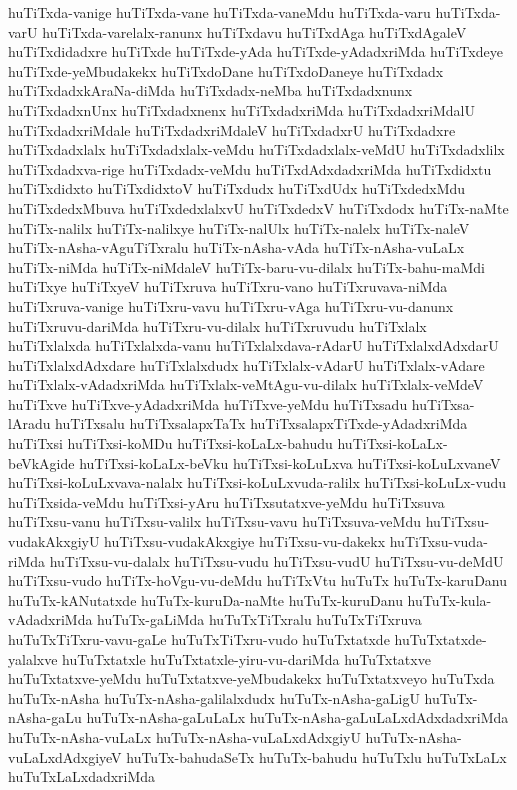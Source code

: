 {huTiTxda-vanige
huTiTxda-vane
huTiTxda-vaneMdu
huTiTxda-varu
huTiTxda-varU
huTiTxda-varelalx-ranunx
huTiTxdavu
huTiTxdAga
huTiTxdAgaleV
huTiTxdidadxre
huTiTxde
huTiTxde-yAda
huTiTxde-yAdadxriMda
huTiTxdeye
huTiTxde-yeMbudakekx
huTiTxdoDane
huTiTxdoDaneye
huTiTxdadx
huTiTxdadxkAraNa-diMda
huTiTxdadx-neMba
huTiTxdadxnunx
huTiTxdadxnUnx
huTiTxdadxnenx
huTiTxdadxriMda
huTiTxdadxriMdalU
huTiTxdadxriMdale
huTiTxdadxriMdaleV
huTiTxdadxrU
huTiTxdadxre
huTiTxdadxlalx
huTiTxdadxlalx-veMdu
huTiTxdadxlalx-veMdU
huTiTxdadxlilx
huTiTxdadxva-rige
huTiTxdadx-veMdu
huTiTxdAdxdadxriMda
huTiTxdidxtu
huTiTxdidxto
huTiTxdidxtoV
huTiTxdudx
huTiTxdUdx
huTiTxdedxMdu
huTiTxdedxMbuva
huTiTxdedxlalxvU
huTiTxdedxV
huTiTxdodx
huTiTx-naMte
huTiTx-nalilx
huTiTx-nalilxye
huTiTx-nalUlx
huTiTx-nalelx
huTiTx-naleV
huTiTx-nAsha-vAguTiTxralu
huTiTx-nAsha-vAda
huTiTx-nAsha-vuLaLx
huTiTx-niMda
huTiTx-niMdaleV
huTiTx-baru-vu-dilalx
huTiTx-bahu-maMdi
huTiTxye
huTiTxyeV
huTiTxruva
huTiTxru-vano
huTiTxruvava-niMda
huTiTxruva-vanige
huTiTxru-vavu
huTiTxru-vAga
huTiTxru-vu-danunx
huTiTxruvu-dariMda
huTiTxru-vu-dilalx
huTiTxruvudu
huTiTxlalx
huTiTxlalxda
huTiTxlalxda-vanu
huTiTxlalxdava-rAdarU
huTiTxlalxdAdxdarU
huTiTxlalxdAdxdare
huTiTxlalxdudx
huTiTxlalx-vAdarU
huTiTxlalx-vAdare
huTiTxlalx-vAdadxriMda
huTiTxlalx-veMtAgu-vu-dilalx
huTiTxlalx-veMdeV
huTiTxve
huTiTxve-yAdadxriMda
huTiTxve-yeMdu
huTiTxsadu
huTiTxsa-lAradu
huTiTxsalu
huTiTxsalapxTaTx
huTiTxsalapxTiTxde-yAdadxriMda
huTiTxsi
huTiTxsi-koMDu
huTiTxsi-koLaLx-bahudu
huTiTxsi-koLaLx-beVkAgide
huTiTxsi-koLaLx-beVku
huTiTxsi-koLuLxva
huTiTxsi-koLuLxvaneV
huTiTxsi-koLuLxvava-nalalx
huTiTxsi-koLuLxvuda-ralilx
huTiTxsi-koLuLx-vudu
huTiTxsida-veMdu
huTiTxsi-yAru
huTiTxsutatxve-yeMdu
huTiTxsuva
huTiTxsu-vanu
huTiTxsu-valilx
huTiTxsu-vavu
huTiTxsuva-veMdu
huTiTxsu-vudakAkxgiyU
huTiTxsu-vudakAkxgiye
huTiTxsu-vu-dakekx
huTiTxsu-vuda-riMda
huTiTxsu-vu-dalalx
huTiTxsu-vudu
huTiTxsu-vudU
huTiTxsu-vu-deMdU
huTiTxsu-vudo
huTiTx-hoVgu-vu-deMdu
huTiTxVtu
huTuTx
huTuTx-karuDanu
huTuTx-kANutatxde
huTuTx-kuruDa-naMte
huTuTx-kuruDanu
huTuTx-kula-vAdadxriMda
huTuTx-gaLiMda
huTuTxTiTxralu
huTuTxTiTxruva
huTuTxTiTxru-vavu-gaLe
huTuTxTiTxru-vudo
huTuTxtatxde
huTuTxtatxde-yalalxve
huTuTxtatxle
huTuTxtatxle-yiru-vu-dariMda
huTuTxtatxve
huTuTxtatxve-yeMdu
huTuTxtatxve-yeMbudakekx
huTuTxtatxveyo
huTuTxda
huTuTx-nAsha
huTuTx-nAsha-galilalxdudx
huTuTx-nAsha-gaLigU
huTuTx-nAsha-gaLu
huTuTx-nAsha-gaLuLaLx
huTuTx-nAsha-gaLuLaLxdAdxdadxriMda
huTuTx-nAsha-vuLaLx
huTuTx-nAsha-vuLaLxdAdxgiyU
huTuTx-nAsha-vuLaLxdAdxgiyeV
huTuTx-bahudaSeTx
huTuTx-bahudu
huTuTxlu
huTuTxLaLx
huTuTxLaLxdadxriMda
}
